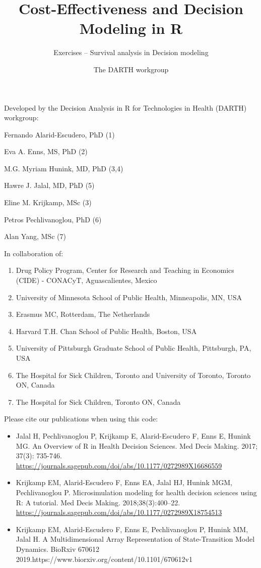 \documentclass[
]{article}
\title{Cost-Effectiveness and Decision Modeling in R}
\subtitle{Exercises -- Survival analysis in Decision modeling}
\author{The DARTH workgroup}
\date{}
\providecommand{\tightlist}{%
  \setlength{\itemsep}{0pt}\setlength{\parskip}{0pt}}
\begin{document}
\maketitle

Developed by the Decision Analysis in R for Technologies in Health
(DARTH) workgroup:

Fernando Alarid-Escudero, PhD (1)

Eva A. Enns, MS, PhD (2)

M.G. Myriam Hunink, MD, PhD (3,4)

Hawre J. Jalal, MD, PhD (5)

Eline M. Krijkamp, MSc (3)

Petros Pechlivanoglou, PhD (6)

Alan Yang, MSc (7)

In collaboration of:

\begin{enumerate}
\def\labelenumi{\arabic{enumi}.}
\tightlist
\item
  Drug Policy Program, Center for Research and Teaching in Economics
  (CIDE) - CONACyT, Aguascalientes, Mexico
\item
  University of Minnesota School of Public Health, Minneapolis, MN, USA
\item
  Erasmus MC, Rotterdam, The Netherlands
\item
  Harvard T.H. Chan School of Public Health, Boston, USA
\item
  University of Pittsburgh Graduate School of Public Health, Pittsburgh,
  PA, USA
\item
  The Hospital for Sick Children, Toronto and University of Toronto,
  Toronto ON, Canada
\item
  The Hospital for Sick Children, Toronto ON, Canada
\end{enumerate}

Please cite our publications when using this code:

\begin{itemize}
\item
  Jalal H, Pechlivanoglou P, Krijkamp E, Alarid-Escudero F, Enns E,
  Hunink MG. An Overview of R in Health Decision Sciences. Med Decis
  Making. 2017; 37(3): 735-746.
  \url{https://journals.sagepub.com/doi/abs/10.1177/0272989X16686559}
\item
  Krijkamp EM, Alarid-Escudero F, Enns EA, Jalal HJ, Hunink MGM,
  Pechlivanoglou P. Microsimulation modeling for health decision
  sciences using R: A tutorial. Med Decis Making. 2018;38(3):400--22.
  \url{https://journals.sagepub.com/doi/abs/10.1177/0272989X18754513}
\item
  Krijkamp EM, Alarid-Escudero F, Enns E, Pechlivanoglou P, Hunink MM,
  Jalal H. A Multidimensional Array Representation of State-Transition
  Model Dynamics. BioRxiv 670612
  2019.https://www.biorxiv.org/content/10.1101/670612v1
\end{itemize}
\end{document}
